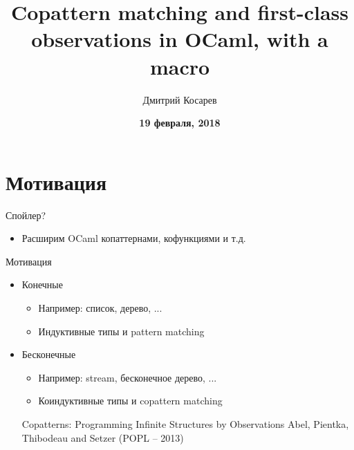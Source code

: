 \documentclass[10pt, mathserif]{beamer}
\title{Copattern matching and first-class observations in OCaml, with a macro}
\author{Дмитрий Косарев}
\date{
  \vskip 2cm
  \small{
    \textbf{19 февраля, 2018}
  }
}
\theoremstyle{definition}
\begin{document}
\begin{frame}
  \titlepage
\end{frame}


\section{Мотивация}

\begin{frame}{Спойлер?}
\begin{itemize}
 \item Расширим OCaml копаттернами, кофункциями и т.д.
\end{itemize}

\end{frame}

\begin{frame}{Мотивация}
 
\begin{itemize}
  \item Конечные
  \begin{itemize}
    \item Например: список, дерево, ...
    \item Индуктивные типы и pattern matching
  \end{itemize}
  \item Бесконечные
  \begin{itemize}
    \item Например: stream, бесконечное дерево, ...
    \item Коиндуктивные типы и copattern matching
  \end{itemize}
  \vspace{1in}
  \pause
  Copatterns: Programming Infinite Structures by Observations
  Abel, Pientka, Thibodeau and Setzer (POPL – 2013)
\end{itemize}

\end{frame}

% 
% 
% 
% 
\end{document}
